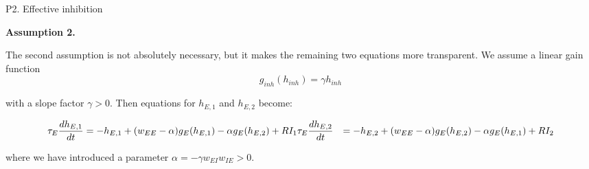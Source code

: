 \documentclass[xcolor=table,dvipsnames,svgnames,aspectratio=169,fontset=fandol]{ctexbeamer}
\let\\\relax
\begin{document}
\begin{frame}{P2. Effective inhibition}

  \textbf{Assumption 2.}

  \vskip 5pt
  The second assumption is not absolutely necessary, but it makes the remaining two equations more transparent. We assume a linear gain function
  $$g_{inh}(h_{inh})=\gamma h_{inh}$$

  with a slope factor $\gamma>0$. Then equations for $h_{E,1}$ and $h_{E,2}$ become:

  \begin{equation}
    \begin{aligned}
      \tau_E \frac{dh_{E,1}}{dt}&=-h_{E,1}+(w_{EE}-\alpha)g_E (h_{E,1})-\alpha g_E (h_{E,2})+RI_1\\
      \tau_E \frac{dh_{E,2}}{dt}&=-h_{E,2}+(w_{EE}-\alpha)g_E (h_{E,2})-\alpha g_E (h_{E,1})+RI_2
    \end{aligned}
  \end{equation}

  where we have introduced a parameter $\alpha=-\gamma w_{EI}w_{IE}>0$.

\end{frame}
\end{document}
